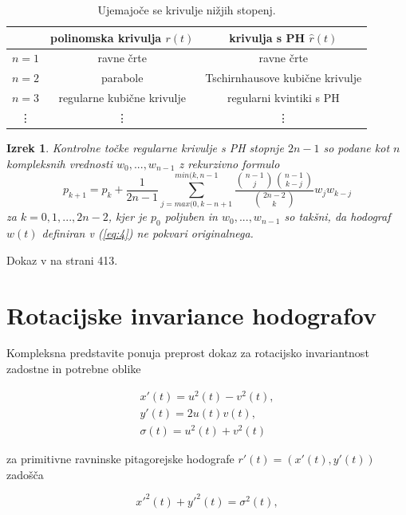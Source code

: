 \documentclass[a4paper]{IEEEtran}
\newtheorem{theorem}{Izrek}
\begin{document}
	\begin{center}
	\begin{table}
	\caption{Ujemajoče se krivulje nižjih stopenj.}
	\label{table:1}
	\begin{tabular}{c c c}
	\hline
	& polinomska krivulja $r(t)$ & krivulja s PH $\hat{r}(t)$ \\
	\hline
	$n=1$ & ravne črte & ravne črte \\
	$n=2$ & parabole & Tschirnhausove kubične krivulje \\
	$n=3$ & regularne kubične krivulje & regularni kvintiki s PH \\
	\vdots & \vdots & \vdots \\
	\hline
	\end{tabular}
	\end{table}
	\end{center}
	
	\begin{theorem}
	Kontrolne točke regularne krivulje s PH stopnje $2n-1$ so podane kot $n$ kompleksnih vrednosti $w_0 ,..., w_{n-1}$ z rekurzivno formulo
	\begin{equation} \label{eq:7}
	p_{k+1} = p_k + \frac{1}{2n-1} \displaystyle\sum_{j=max(0,k-n+1}^{min(k,n-1} \frac{\binom{n-1}{j} \binom{n-1}{k-j}}{\binom{2n-2}{k}} w_j w_{k-j}
	\end{equation}
	za $k=0,1,...,2n-2$, kjer je $p_0$ poljuben in $w_0,...,w_{n-1}$ so takšni, da hodograf $w(t)$ definiran v (\ref{eq:4}) ne pokvari originalnega.
	\end{theorem}
	
	\proof
	Dokaz v \cite{knjiga} na strani 413.
	\endproof
	
	
	\section{Rotacijske invariance hodografov}
	Kompleksna predstavite ponuja preprost dokaz za rotacijsko invariantnost zadostne in potrebne oblike
	
	\begin{eqnarray}
	x \prime (t)=u^2(t)-v^2(t), \nonumber \\
	y \prime (t)=2u(t)v(t), \\
	\sigma (t)=u^2(t)+v^2(t)\nonumber 
	\end{eqnarray}
	
	za primitivne ravninske pitagorejske hodografe $r\prime (t)=(x\prime (t),y\prime (t))$ zadošča
	
	\begin{equation}
	x \prime ^2 (t) + y \prime ^2 (t) = \sigma ^2 (t),
	\end{equation}
\end{document}
